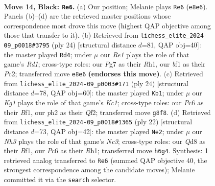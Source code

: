\documentclass[11pt]{article}
\begin{document}
\clearpage

\begin{figure}[p]\centering
\begin{subfigure}{0.46\textwidth}\centering
\resizebox{\linewidth}{!}{%
\newchessgame
\chessboard[
  setfen={rnbqr1k1/pp3ppp/2p4n/3p4/PP1P1B1b/2N1PP2/2QKN1PP/R4B1R b - - 0 14},
  showmover=false,
  pgfstyle=straightmove, color=movearrow, markmove={e8-e6}
]}
\caption{}
\end{subfigure}\hfill
\begin{subfigure}{0.46\textwidth}\centering
\resizebox{\linewidth}{!}{%
\newchessgame
\chessboard[
  setfen={1rb1k2r/2qnbppp/p2ppn2/1p4B1/4PP2/PNN5/1PP3PP/2KRQB1R w k - 3 13},
  showmover=false,
  pgfstyle=straightmove, color=movearrow, markmove={d1-d4}
]}
\caption{}
\end{subfigure}
\\[4pt]
\begin{subfigure}{0.46\textwidth}\centering
\resizebox{\linewidth}{!}{%
\newchessgame
\chessboard[
  setfen={r3kb1r/2qn1ppp/pn1pb3/1p2p3/4P1P1/1NN1BP2/PPP2Q1P/2KR1B1R w kq - 3 13},
  showmover=false,
  pgfstyle=straightmove, color=movearrow, markmove={c1-b1}
]}
\caption{}
\end{subfigure}\hfill
\begin{subfigure}{0.46\textwidth}\centering
\resizebox{\linewidth}{!}{%
\newchessgame
\chessboard[
  setfen={r1b1kb1r/2qn1ppp/p2ppn2/8/1p2P3/1NN1BP2/PPP2QPP/2KR1B1R w kq - 0 12},
  showmover=false,
  pgfstyle=straightmove, color=movearrow, markmove={c3-e2}
]}
\caption{}
\end{subfigure}
\caption{\textbf{Move 14, Black: \texttt{Re6}.} (a) Our position; Melanie plays \texttt{Re6} (\texttt{e8e6}). Panels (b)--(d) are the retrieved master positions whose correspondence most drove this move (highest QAP objective among those that transfer to it). (b) Retrieved from \texttt{lichess\_elite\_2024-09\_p0018\#3795} (ply 24) [structural distance $d$=81, QAP obj=40]: the master played \texttt{Rd4}; under $\mu$ our \emph{Re1} plays the role of that game's \emph{Rd1}; cross-type roles: our \emph{P}g7 as their \emph{R}h1, our \emph{b}f1 as their \emph{P}c2; transferred move \texttt{e8e6} \textbf{(endorses this move)}. (c) Retrieved from \texttt{lichess\_elite\_2024-09\_p0003\#171} (ply 24) [structural distance $d$=78, QAP obj=60]: the master played \texttt{Kb1}; under $\mu$ our \emph{Kg1} plays the role of that game's \emph{Kc1}; cross-type roles: our \emph{P}c6 as their \emph{B}f1, our \emph{p}h2 as their \emph{Q}f2; transferred move \texttt{g8f8}. (d) Retrieved from \texttt{lichess\_elite\_2024-09\_p0018\#1365} (ply 22) [structural distance $d$=73, QAP obj=42]: the master played \texttt{Ne2}; under $\mu$ our \emph{Nh3} plays the role of that game's \emph{Nc3}; cross-type roles: our \emph{Q}d8 as their \emph{B}f1, our \emph{P}c6 as their \emph{R}h1; transferred move \texttt{h6g4}. Synthesis: 1 retrieved analog transferred to \texttt{Re6} (summed QAP objective 40, the strongest correspondence among the candidate moves); Melanie committed it via the \texttt{search} selector.}
\label{fig:thought-m27}
\end{figure}
\end{document}
